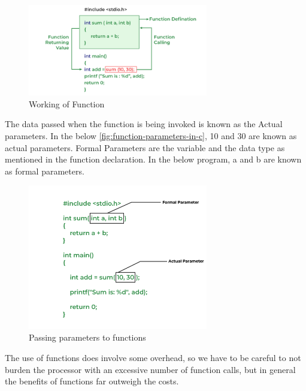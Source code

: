         \begin{figure}[!ht]
                \centering
                \captionsetup{justification=centering,margin=0.05cm}
                \includegraphics[width=0.7\textwidth]{figures/working-of-function-in-c.png}
                \caption{\label{fig:working-of-function-in-c}Working of Function}
        \end{figure}

        The data passed when the function is being invoked is known as the Actual parameters. In the below \autoref{fig:function-parameters-in-c}, 10 and 30 are known as actual parameters. Formal Parameters are the variable and the data type as mentioned in the function declaration. In the below program, a and b are known as formal parameters.

        \begin{figure}[!ht]
                \centering
                \captionsetup{justification=centering,margin=0.05cm}
                \includegraphics[width=0.7\textwidth]{figures/function-parameters-in-c.png}
                \caption{\label{fig:function-parameters-in-c}Passing parameters to functions}
        \end{figure}
        
        The use of functions does involve some overhead, so we have to be careful to not burden the processor with an excessive number of function calls, but in general the benefits of functions far outweigh the costs.
            
